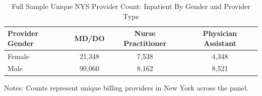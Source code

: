 \documentclass{article}
\begin{document}
\begin{table}[htbp]
\centering
\caption{Full Sample Unique NYS Provider Count: Inpatient By Gender and Provider Type}
\label{tab:inpatient_gender_x_provtype_full}
\begin{threeparttable}
\begin{tabular}{lccc}
\toprule
\textbf{Provider Gender} & \textbf{MD/DO} & \textbf{Nurse Practitioner} & \textbf{Physician Assistant} \\
\midrule
        Female & 21,348 & 7,538 & 4,348 \\
        Male & 90,060 & 8,162 & 8,521 \\
\bottomrule
\end{tabular}
\begin{tablenotes}[flushleft]
\footnotesize
\item Notes: Counts represent unique billing providers in New York across the panel.
\end{tablenotes}
\end{threeparttable}
\end{table}
\end{document}

